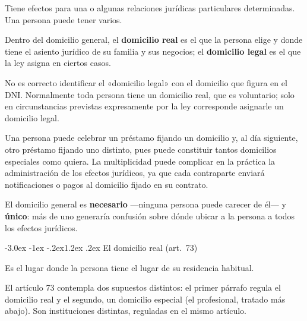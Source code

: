 \documentclass[12pt,oneside]{book}
\makeatletter
\renewcommand\section{\@startsection{section}{1}{\z@}%
  {-3.0ex \@plus -1ex \@minus -.2ex}{1.2ex \@plus .2ex}%
  {\normalfont\large\bfseries\color{acento}}}
\makeatother
\begin{document}
\begin{definicion}
Tiene efectos para una o algunas relaciones jurídicas particulares determinadas. Una persona puede tener varios.
\end{definicion}

Dentro del domicilio general, el \textbf{domicilio real} es el que la persona elige y donde tiene el asiento jurídico de su familia y sus negocios; el \textbf{domicilio legal} es el que la ley asigna en ciertos casos.

\begin{advertencia}
No es correcto identificar el «domicilio legal» con el domicilio que figura en el DNI. Normalmente toda persona tiene un domicilio real, que es voluntario; solo en circunstancias previstas expresamente por la ley corresponde asignarle un domicilio legal.
\end{advertencia}

\begin{ejemplo}
Una persona puede celebrar un préstamo fijando un domicilio y, al día siguiente, otro préstamo fijando uno distinto, pues puede constituir tantos domicilios especiales como quiera. La multiplicidad puede complicar en la práctica la administración de los efectos jurídicos, ya que cada contraparte enviará notificaciones o pagos al domicilio fijado en su contrato.
\end{ejemplo}

\begin{importante}
El domicilio general es \textbf{necesario} ---ninguna persona puede carecer de él--- y \textbf{único}: más de uno generaría confusión sobre dónde ubicar a la persona a todos los efectos jurídicos.
\end{importante}

\section{El domicilio real (art.~73)}

\begin{definicion}
Es el lugar donde la persona tiene el lugar de su residencia habitual.
\end{definicion}

El artículo 73 contempla dos supuestos distintos: el primer párrafo regula el domicilio real y el segundo, un domicilio especial (el profesional, tratado más abajo). Son instituciones distintas, reguladas en el mismo artículo.
\end{document}
